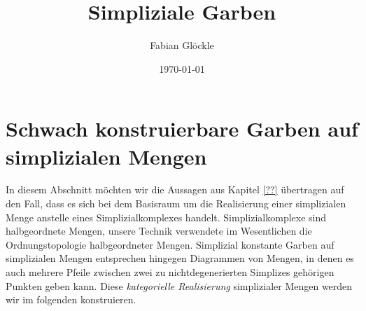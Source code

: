 



\title{Simpliziale Garben}
\author{Fabian Glöckle}
\date{\today}

\section{Schwach konstruierbare Garben auf simplizialen Mengen}

In diesem Abschnitt möchten wir die Aussagen aus Kapitel \ref{??}
übertragen auf den Fall, dass es sich bei dem Basisraum um die
Realisierung einer simplizialen Menge anstelle eines
Simplizialkomplexes handelt. Simplizialkomplexe sind halbgeordnete
Mengen, unsere Technik verwendete im Wesentlichen die
Ordnungstopologie halbgeordneter Mengen. Simplizial konstante Garben
auf simplizialen Mengen entsprechen hingegen Diagrammen von Mengen, in
denen es auch mehrere Pfeile zwischen zwei zu nichtdegenerierten
Simplizes gehörigen Punkten geben kann. Diese \emph{kategorielle
  Realisierung} simplizialer Mengen werden wir im folgenden
konstruieren.

